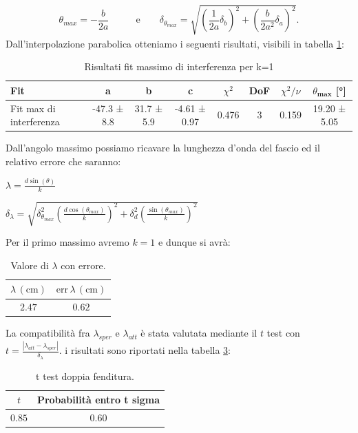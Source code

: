 \documentclass[a4paper]{article}
\begin{document}
\begin{align}
  \theta_{max} = -\dfrac{b}{2a} \qquad & \text{e}\qquad
  \delta_{\theta_{max}} = \sqrt{\left(\dfrac{1}{2a}\delta_b\right)^2 + \left(\dfrac{b}{2a^2}\delta_a\right)^2}. \label{eq:angolo_max}
\end{align}
Dall'interpolazione parabolica otteniamo i seguenti risultati, visibili in tabella \ref{tab:fit.doppiafenditura}:
\begin{table}[htbp]
\centering
\begin{tabular}{|l|ccccccc|}
\hline
Fit & a & b & c & $\chi^2$ & DoF & $\chi^2/\nu$ & $\theta_{\textbf{max}}$ [\si{\degree}] \\\hline\hline
Fit max di interferenza & -47.3 ± 8.8 & 31.7 ± 5.9 & -4.61 ± 0.97 & 0.476 & 3 & 0.159 & 19.20 ± 5.05\\\hline
\end{tabular}
\caption{Risultati fit massimo di interferenza per k=1}
\label{tab:fit.doppiafenditura}
\end{table}
Dall'angolo massimo possiamo ricavare la lunghezza d'onda del fascio ed il relativo errore che saranno:
\begin{center}
\begin{minipage}{0.45\textwidth}
\centering
$\lambda = \frac{d \sin(\theta)}{k}$
\end{minipage}
\hfill
\begin{minipage}{0.45\textwidth}
\centering
$\delta_{\lambda} = \sqrt{ \delta_{\theta_{max}}^2 \left( \frac{d \cos(\theta_{max})}{k} \right)^2 + \delta_d^2 \left( \frac{\sin(\theta_{max})}{k} \right)^2 }$
\end{minipage}
\end{center}
Per il primo massimo avremo $k=1$ e dunque si avrà:
\begin{table}[H]
\centering
\begin{tabular}{|c|c|}
\hline
$\lambda\,(\text{cm})$ & $\text{err}\,\lambda\,(\text{cm})$ \\
\hline
$2.47$ & $0.62$ \\
\hline
\end{tabular}
\caption{Valore di $\lambda$ con errore.}
\label{tab:valori di lambda}
\end{table}
La compatibilità fra $\lambda_{sper}$ e $\lambda_{att}$ è stata valutata mediante il $t$ test con $t=\frac{|\lambda_{att}-\lambda_{sper}|}{\delta_{\lambda}}$. i risultati sono riportati nella tabella \ref{tab:test compatibilità doppia fenditura}:
\begin{table}[H]
\centering
\begin{tabular}{|c|c|}
\hline
$t$ & Probabilità entro t sigma \\
\hline
$0.85$ & $0.60$ \\
\hline
\end{tabular}
\caption{t test doppia fenditura.}
\label{tab:test compatibilità doppia fenditura}
\end{table}
\end{document}
